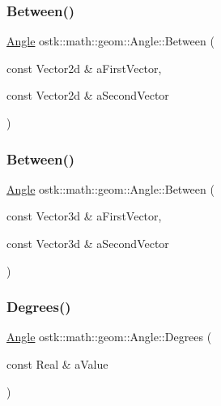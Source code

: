 \subsubsection{\texorpdfstring{Between()}{Between()}\hspace{0.1cm}{\footnotesize\ttfamily [1/2]}}
{\footnotesize\ttfamily \hyperlink{classostk_1_1math_1_1geom_1_1_angle}{Angle} ostk\+::math\+::geom\+::\+Angle\+::\+Between (\begin{DoxyParamCaption}\item[{const Vector2d \&}]{a\+First\+Vector,  }\item[{const Vector2d \&}]{a\+Second\+Vector }\end{DoxyParamCaption})\hspace{0.3cm}{\ttfamily [static]}}

\mbox{\label{classostk_1_1math_1_1geom_1_1_angle_a6f7ddfc10e30a40b6af7ede9709f8d68}} 
\subsubsection{\texorpdfstring{Between()}{Between()}\hspace{0.1cm}{\footnotesize\ttfamily [2/2]}}
{\footnotesize\ttfamily \hyperlink{classostk_1_1math_1_1geom_1_1_angle}{Angle} ostk\+::math\+::geom\+::\+Angle\+::\+Between (\begin{DoxyParamCaption}\item[{const Vector3d \&}]{a\+First\+Vector,  }\item[{const Vector3d \&}]{a\+Second\+Vector }\end{DoxyParamCaption})\hspace{0.3cm}{\ttfamily [static]}}

\mbox{\label{classostk_1_1math_1_1geom_1_1_angle_a2cefda601167af07f61f0477776203ca}} 
\subsubsection{\texorpdfstring{Degrees()}{Degrees()}}
{\footnotesize\ttfamily \hyperlink{classostk_1_1math_1_1geom_1_1_angle}{Angle} ostk\+::math\+::geom\+::\+Angle\+::\+Degrees (\begin{DoxyParamCaption}\item[{const Real \&}]{a\+Value }\end{DoxyParamCaption})\hspace{0.3cm}{\ttfamily [static]}}

